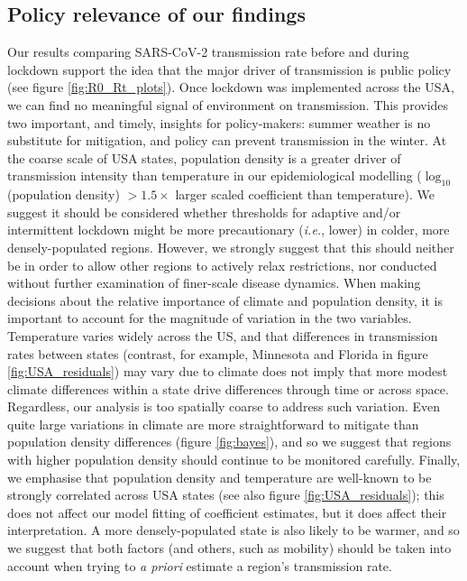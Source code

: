 \documentclass[12pt,english,a4paper]{article}
\newcommand{\virus}{SARS-CoV-2\xspace}
\begin{document}
\subsection*{Policy relevance of our findings}
Our results comparing \virus transmission rate before and during lockdown support the idea that the major driver of transmission is public policy \cite{Jarvis2020, Lau2020} (see figure \ref{fig:R0_Rt_plots}). Once lockdown was implemented across the USA, we can find no meaningful signal of environment on transmission. This provides two important, and timely, insights for policy-makers: summer weather is no substitute for mitigation, and policy can prevent transmission in the winter. 
At the coarse scale of USA states, population density is a greater driver of transmission intensity than temperature in our epidemiological modelling ($\log_{10}$(population density) $> 1.5 \times$ larger scaled coefficient than temperature). 
We suggest it should be considered whether thresholds for adaptive and/or intermittent lockdown might be more precautionary (\emph{i.e.}, lower) in colder, more densely-populated regions. However, we strongly suggest that this should neither be in order to allow other regions to actively relax restrictions, nor conducted without further examination of finer-scale disease dynamics. When making decisions about the relative importance of climate and population density, it is important to account for the magnitude of variation in the two variables. 
Temperature varies widely across the US, and that differences in transmission rates between states (contrast, for example, Minnesota and Florida in figure \ref{fig:USA_residuals}) may vary due to climate does not imply that more modest climate differences within a state drive differences through time or across space.
Regardless, our analysis is too spatially coarse to address such variation. Even quite large variations in climate are more straightforward to mitigate than population density differences (figure \ref{fig:bayes}), and so we suggest that regions with higher population density should continue to be monitored carefully. Finally, we emphasise that population density and temperature are well-known to be strongly correlated across USA states (see also figure \ref{fig:USA_residuals}); this does not affect our model fitting of coefficient estimates, but it does affect their interpretation. A more densely-populated state is also likely to be warmer, and so we suggest that both factors (and others, such as mobility) should be taken into account when trying to \emph{a priori} estimate a region's transmission rate. 
\end{document}

